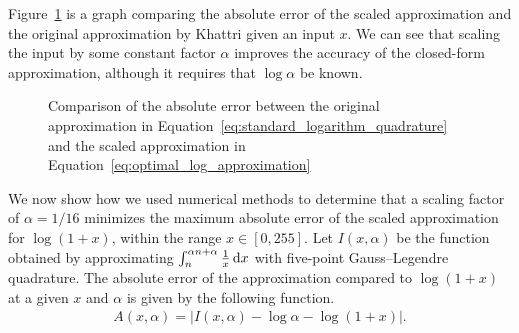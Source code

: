 Figure~\ref{fig:log_error_comparison} is a graph comparing the absolute error of the scaled approximation and the original approximation by Khattri given an input $x$. We can see that scaling the input by some constant factor $\alpha$ improves the accuracy of the closed-form approximation, although it requires that $\log \alpha$ be known.

\begin{figure}[ht]
	\centering
	\caption{Comparison of the absolute error between the original approximation in Equation~\ref{eq:standard_logarithm_quadrature} and the scaled approximation in Equation~\ref{eq:optimal_log_approximation}}
	\label{fig:log_error_comparison}
\end{figure}

We now show how we used numerical methods to determine that a scaling factor of $\alpha = 1/16$ minimizes the maximum absolute error of the scaled approximation for $\log{(1+x)}$, within the range $x \in [0, 255]$.
Let $I(x,\alpha)$ be the function obtained by approximating $\int_{n}^{\alpha n + \alpha}{\frac{1}{x}\mathop{}\!\mathrm{d} x}$ with five-point Gauss--Legendre quadrature. The absolute error of the approximation compared to  $\log{(1+x)}$ at a given $x$ and $\alpha$ is given by the following function.
\begin{align*}
	A(x,\alpha) = \left| I(x,\alpha) - \log\alpha - \log{(1+x)}\right|.
\end{align*}

